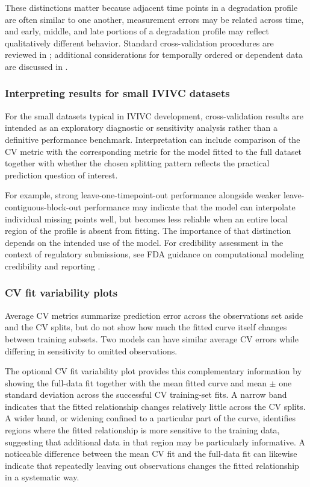 These distinctions matter because adjacent time points in a degradation profile are often similar to one another, measurement errors may be related across time, and early, middle, and late portions of a degradation profile may reflect qualitatively different behavior. Standard cross-validation procedures are reviewed in \cite{arlot2010}; additional considerations for temporally ordered or dependent data are discussed in \cite{bergmeir2012,roberts2017,bergmeir2018}.

\subsubsection*{Interpreting results for small IVIVC datasets}

For the small datasets typical in IVIVC development, cross-validation results are intended as an exploratory diagnostic or sensitivity analysis rather than a definitive performance benchmark. Interpretation can include comparison of the CV metric with the corresponding metric for the model fitted to the full dataset together with whether the chosen splitting pattern reflects the practical prediction question of interest.

For example, strong leave-one-timepoint-out performance alongside weaker leave-contiguous-block-out performance may indicate that the model can interpolate individual missing points well, but becomes less reliable when an entire local region of the profile is absent from fitting. The importance of that distinction depends on the intended use of the model. For credibility assessment in the context of regulatory submissions, see FDA guidance on computational modeling credibility and reporting \cite{fda_modeling_guidance,fda_reporting_guidance}.

\subsubsection*{CV fit variability plots}

Average CV metrics summarize prediction error across the observations set aside and the CV splits, but do not show how much the fitted curve itself changes between training subsets. Two models can have similar average CV errors while differing in sensitivity to omitted observations.

The optional CV fit variability plot provides this complementary information by showing the full-data fit together with the mean fitted curve and mean $\pm$ one standard deviation across the successful CV training-set fits. A narrow band indicates that the fitted relationship changes relatively little across the CV splits. A wider band, or widening confined to a particular part of the curve, identifies regions where the fitted relationship is more sensitive to the training data, suggesting that additional data in that region may be particularly informative. A noticeable difference between the mean CV fit and the full-data fit can likewise indicate that repeatedly leaving out observations changes the fitted relationship in a systematic way.

